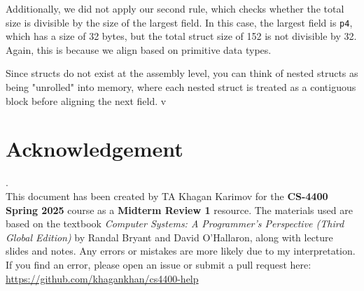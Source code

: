 \documentclass{article}
\begin{document}
Additionally, we did not apply our second rule, which checks whether the total size is divisible by the size of the largest field. In this case, the largest field is \texttt{p4}, which has a size of 32 bytes, but the total struct size of 152 is not divisible by 32. Again, this is because we align based on primitive data types.

Since structs do not exist at the assembly level, you can think of nested structs as being "unrolled" into memory, where each nested struct is treated as a contiguous block before aligning the next field.
v

\section{Acknowledgement}. \\
\label{sec:ack}
This document has been created by TA Khagan Karimov for the \textbf{CS-4400 Spring 2025} course as a \textbf{Midterm Review 1} resource. The materials used are based on the textbook \textit{Computer Systems: A Programmer's Perspective (Third Global Edition)} by Randal Bryant and David O'Hallaron, along with lecture slides and notes. Any errors or mistakes are more likely due to my interpretation. If you find an error, please open an issue or submit a pull request here: 
\noindent\url{https://github.com/khagankhan/cs4400-help}
\end{document}
